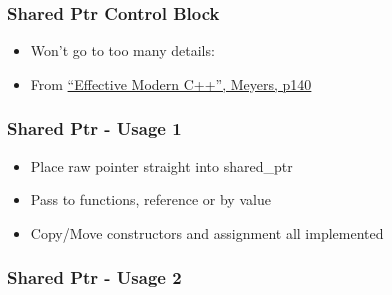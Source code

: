 \subsubsection{Shared Ptr Control Block}\label{shared-ptr-control-block}

\begin{itemize}
\item
  Won't go to too many details: 
\item
  From
  \href{https://www.amazon.co.uk/Effective-Modern-Specific-Ways-Improve/dp/1491903996/ref=sr_1_1?ie=UTF8\&qid=1484571499\&sr=8-1\&keywords=Effective+Modern+C\%2B\%2B}{``Effective
  Modern C++'', Meyers, p140}
\end{itemize}

\subsubsection{Shared Ptr - Usage 1}\label{shared-ptr---usage-1}

\begin{itemize}
\itemsep1pt\parskip0pt
\item
  Place raw pointer straight into shared\_ptr
\item
  Pass to functions, reference or by value
\item
  Copy/Move constructors and assignment all implemented
\end{itemize}

\subsubsection{Shared Ptr - Usage 2}\label{shared-ptr---usage-2}

\begin{Shaded}
\begin{Highlighting}[]
  
\NormalTok{\{}
  \NormalTok{;}
\NormalTok{\}}
  
\NormalTok{\{}
  \NormalTok{;}
\NormalTok{\}}
 
   \NormalTok{,}\NormalTok{));}
    
    
\NormalTok{\}}

\end{Highlighting}
\end{Shaded}

